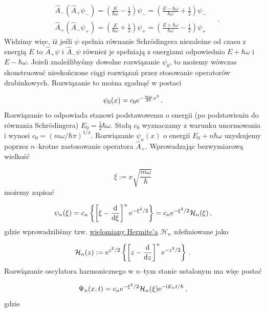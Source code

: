 \documentclass{myclass}
\begin{document}
\begin{equation*}
\begin{split}
    &\hat{A}_-(\hat{A}_+\psi_-)=\left(\frac{E}{\hbar\omega}-\frac{1}{2}\right)\psi_-=\left(\frac{E-\hbar\omega}{\hbar\omega}+\frac{1}{2}\right)\psi_-\\
    &\hat{A}_+(\hat{A}_-\psi_+)=\left(\frac{E}{\hbar\omega}+\frac{1}{2}\right)\psi_+=\left(\frac{E+\hbar\omega}{\hbar\omega}-\frac{1}{2}\right)\psi_+
\end{split}\quad\,.
\end{equation*}
Widzimy więc, iż jeśli \(\psi\) spełnia równanie Schr{\"o}dingera niezależne od czasu z energią
\(E\) to \(\hat{A}_+\psi\) i \(\hat{A}_-\psi\) również je spełniają z energiami odpowiednio
\(E+\hbar\omega\) i \(E-\hbar\omega\). Jeżeli znaleźlibyśmy dowolne rozwiązanie \(\psi_0\), to
możemy wówczas skonstruować nieskończone ciągi rozwiązań przez stosowanie operatorów drabinkowych.
Rozwiązanie to można zgadnąć w postaci

\begin{equation*}
    \psi_0(x)=c_0\mathrm{e}^{-\frac{m\omega}{2\hbar}x^2}\,.
\end{equation*}
Rozwiązanie to odpowiada stanowi podstawowemu o energii (po podstawieniu do równania
Schr{\"o}dingera) \(\boxed{E_0=\frac{1}{2}\hbar\omega}\). Stałą \(c_0\) wyznaczamy z warunku
unormowania i wynosi \(\boxed{c_0=(m\omega/\hbar\pi)^{1/4}}\). Rozwiązanie \(\psi_n(x)\) o energii
\(E_0+n\hbar\omega\) uzyskujemy poprzez \(n\)--krotne zastosowanie operatora \(\hat{A}_+\).
Wprowadzając bezwymiarową wielkość

\begin{equation*}
    \xi:=x\sqrt{\frac{m\omega}{\hbar}}
\end{equation*}
możemy zapisać

\begin{equation*}
    \psi_n(\xi)=c_n\left\{\left[\xi-\dv[]{}{\xi}\right]^n\mathrm{e}^{-\xi^2/2}\right\}=c_n\mathrm{e}^{-\xi^2/2}\mathcal{H}_n(\xi)\,,
\end{equation*}
gdzie wprowadziliśmy tzw. \underline{wielomiany Hermite'a} \(\mathcal{H}_n\) zdefiniowane jako

\begin{equation*}
    \mathcal{H}_n(z):=\mathrm{e}^{z^2/2}\left\{\left[z-\dv[]{}{z}\right]^n\mathrm{e}^{-z^2/2}\right\}\,.
\end{equation*}
Rozwiązanie oscylatora harmonicznego w \(n\)--tym stanie ustalonym ma więc postać

\begin{equation*}
    \Psi_n(x,t)=c_n\mathrm{e}^{-\xi^2/2}\mathcal{H}_n(\xi)\mathrm{e}^{-\mathrm{i} E_nt/\hbar}\,,
\end{equation*}
gdzie
\end{document}
